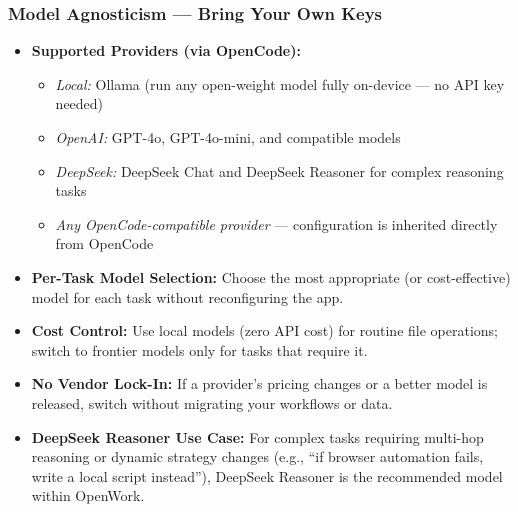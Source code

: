 \begin{frame}[fragile]\frametitle{Model Agnosticism — Bring Your Own Keys}
  \begin{itemize}
    \item \textbf{Supported Providers (via OpenCode):}
      \begin{itemize}
        \item \textit{Local:} Ollama (run any open-weight model fully on-device — no API key needed)
        \item \textit{OpenAI:} GPT-4o, GPT-4o-mini, and compatible models
        \item \textit{DeepSeek:} DeepSeek Chat and DeepSeek Reasoner for complex reasoning tasks
        \item \textit{Any OpenCode-compatible provider} — configuration is inherited directly from OpenCode
      \end{itemize}
    \item \textbf{Per-Task Model Selection:} Choose the most appropriate (or cost-effective) model for each task without reconfiguring the app.
    \item \textbf{Cost Control:} Use local models (zero API cost) for routine file operations; switch to frontier models only for tasks that require it.
    \item \textbf{No Vendor Lock-In:} If a provider's pricing changes or a better model is released, switch without migrating your workflows or data.
    \item \textbf{DeepSeek Reasoner Use Case:} For complex tasks requiring multi-hop reasoning or dynamic strategy changes (e.g., ``if browser automation fails, write a local script instead''), DeepSeek Reasoner is the recommended model within OpenWork.
  \end{itemize}
\end{frame}

